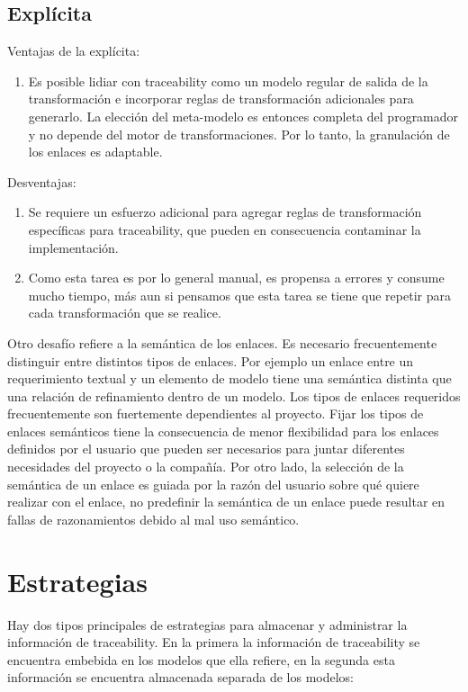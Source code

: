 \documentclass[a4paper,12pt,oneside]{book}
\begin{document}
\subsection{Explícita}

Ventajas de la explícita:

\begin{enumerate}
\item Es posible lidiar con traceability como un modelo regular de salida de la transformación e incorporar reglas de transformación adicionales para generarlo. La elección del meta-modelo es entonces completa del programador y no depende del motor de transformaciones. Por lo tanto, la granulación de los enlaces es adaptable.
\end{enumerate}

Desventajas:

\begin{enumerate}
\item     Se requiere un esfuerzo adicional para agregar reglas de transformación específicas para traceability, que pueden en consecuencia contaminar la implementación.
\item    Como esta tarea es por lo general manual, es propensa a errores y consume mucho tiempo, más aun si pensamos que esta tarea se tiene que repetir para cada transformación que se realice.
\end{enumerate}

Otro desafío refiere a la semántica de los enlaces. Es necesario frecuentemente distinguir entre distintos tipos de enlaces. Por ejemplo un enlace entre un requerimiento textual y un elemento de modelo tiene una semántica distinta que una relación de refinamiento dentro de un modelo. Los tipos de enlaces requeridos frecuentemente son fuertemente dependientes al proyecto. Fijar los tipos de enlaces semánticos tiene la consecuencia de menor flexibilidad para los enlaces definidos por el usuario que pueden ser necesarios para juntar diferentes necesidades del proyecto o la compañía. Por otro lado, la selección de la semántica de un enlace es guiada por la razón del usuario sobre qué quiere realizar con el enlace, no predefinir la semántica de un enlace puede resultar en fallas de razonamientos debido al mal uso semántico.

\section{Estrategias}

\cite{DrivalosPaigeFernandesKolovos} Hay dos tipos principales de estrategias para almacenar y administrar la información de traceability. En la primera la información de traceability se encuentra embebida en los modelos que ella refiere, en la segunda esta información se encuentra almacenada separada de los modelos:
\end{document}
